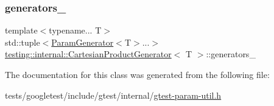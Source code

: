 \subsubsection{\texorpdfstring{generators\+\_\+}{generators\_}}
{\footnotesize\ttfamily template$<$typename... T$>$ \\
std\+::tuple$<$\hyperlink{classtesting_1_1internal_1_1ParamGenerator}{Param\+Generator}$<$T$>$...$>$ \hyperlink{classtesting_1_1internal_1_1CartesianProductGenerator}{testing\+::internal\+::\+Cartesian\+Product\+Generator}$<$ T $>$\+::generators\+\_\+\hspace{0.3cm}{\ttfamily [private]}}



The documentation for this class was generated from the following file\+:\begin{DoxyCompactItemize}
\item 
tests/googletest/include/gtest/internal/\hyperlink{gtest-param-util_8h}{gtest-\/param-\/util.\+h}\end{DoxyCompactItemize}
